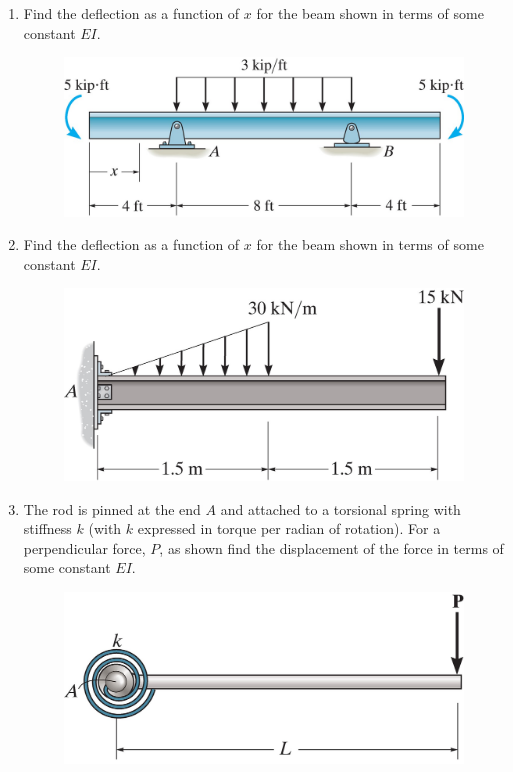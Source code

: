 \documentclass[12pt, oneside]{article}
\begin{document}
\begin{enumerate}
	\item %
		Find the deflection as a function of $x$ for the beam shown in terms of some constant $EI$.
		\begin{figure}[H]
			\centering
			\includegraphics[width=0.6\linewidth]{12-35}
		\end{figure}
		\newpage

	\item %
		Find the deflection as a function of $x$ for the beam shown in terms of some constant $EI$.
		\begin{figure}[H]
			\centering
			\includegraphics[width=0.6\linewidth]{12-39}
		\end{figure}

	\item %
		The rod is pinned at the end $A$ and attached to a torsional spring with stiffness $k$ (with $k$ expressed in torque per radian of rotation).
		For a perpendicular force, $P$, as shown find the displacement of the force in terms of some constant $EI$.
		\begin{figure}[H]
			\centering
			\includegraphics[width=0.6\linewidth]{12-93}
		\end{figure}

\end{enumerate}
\end{document}
